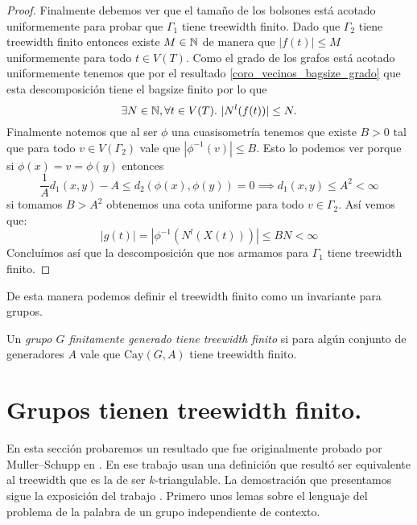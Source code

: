 \documentclass[tesis.tex]{subfiles}
\begin{document}
\begin{proof}
	Finalmente debemos ver que el tamaño de los bolsones está acotado uniformemente para probar que $\Gamma_{1}$ tiene treewidth finito.
	Dado que $\Gamma_2$ tiene treewidth finito entonces existe $M \in \mathbb{N}$ de manera que  $|f(t)| \le M$ uniformemente para todo $t \in V(T)$. 
	Como el grado de los grafos está acotado uniformemente tenemos que por el resultado \ref{coro_vecinos_bagsize_grado} que esta descomposición tiene el bagsize finito por lo que
	\[
	\exists N \in \mathbb{N}, \forall t \in V(T). \  |N^l(f(t))| \le N.
	\]
	Finalmente notemos que al ser $\phi$ una cuasisometría tenemos que existe $B > 0$ tal que para todo $v \in V(\Gamma_2)$ vale que $|\phi^{-1}(v)| \le B$.
	Esto lo podemos ver porque si $\phi(x) = v = \phi(y)$ entonces
	\[
	\frac{1}{A}d_{1}(x,y) - A \le d_{2}(\phi(x), \phi(y) ) = 0 \implies d_{1}(x,y) \le A^2 < \infty
	\]
	si tomamos $B > A^2$ obtenemos una cota uniforme para todo $v \in \Gamma_2$. 
	Así vemos que:
	\[
	|g(t)| = |\phi^{-1}(N^l(X(t)))| \le BN < \infty
	\]
	Concluímos así que la descomposición que nos armamos para $\Gamma_1$ tiene treewidth finito.
\end{proof}

De esta manera podemos definir el treewidth finito como un invariante para grupos.

\begin{deff}
	Un \emph{grupo $G$ finitamente generado tiene treewidth finito} si para algún conjunto de generadores $A$ vale que $\text{Cay}(G,A)$ tiene treewidth finito.
\end{deff}


\section{Grupos \ic tienen treewidth finito.}\label{secc_MuSch}

En esta sección probaremos un resultado que fue originalmente probado por Muller--Schupp en \cite{muller1985theory}.
En ese trabajo usan una definición que resultó ser equivalente al treewidth que es la de ser $k$-triangulable.
La demostración que presentamos sigue la exposición del trabajo \cite{diekert2017context}.
Primero unos lemas sobre el lenguaje del problema de la palabra de un grupo independiente de contexto.
\end{document}
